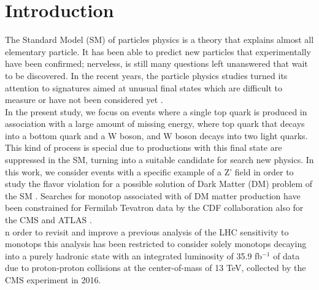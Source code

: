 \section{Introduction}
\label{sec:introduction}

The Standard Model (SM) of particles physics is a theory that explains almost all elementary particle. It has been able to predict new particles that experimentally have been confirmed; nerveless, is still many questions left unanswered that wait to be discovered. In the recent years, the particle physics studies turned its attention to signatures aimed at unusual final states which are difficult to measure or have not been considered yet \cite{318}.\\ 

In the present study, we focus on events where a single top quark is produced in association with a large amount of missing energy, where top quark that decays into a bottom quark and a W boson, and W boson decays into two light quarks. This kind of process is special due to productions with this final state are suppressed in the SM, turning into a suitable candidate for search new physics. In this work, we consider events with a specific example of a Z' field in order to study the flavor violation for a possible solution of Dark Matter (DM) problem of the SM \cite{319}. Searches for monotop associated with of DM matter production have been constrained for Fermilab Tevatron data by the CDF \cite{321} collaboration also for the CMS \cite{322} and ATLAS \cite{323}.\\

n order to revisit and improve a previous analysis of the LHC sensitivity to monotops this analysis has been restricted to consider solely monotops decaying into a purely hadronic state with an integrated luminosity of 35.9 fb$^{-1}$ of data due to proton-proton collisions at the center-of-mass of 13 TeV, collected by the CMS experiment in 2016. 

\clearpage
